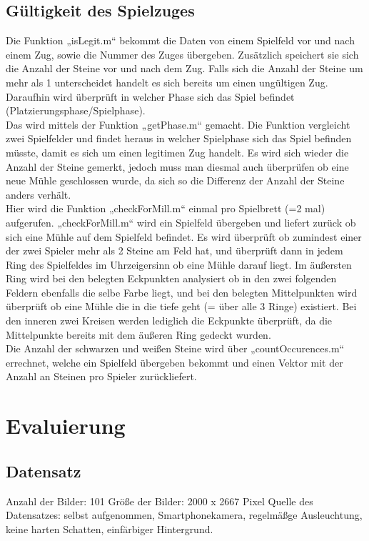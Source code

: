 \documentclass[paper=A4, deutsch]{scrartcl}
\begin{document}
\subsection{Gültigkeit des Spielzuges}
Die Funktion „isLegit.m“ bekommt die Daten von einem Spielfeld vor und nach einem Zug, sowie die Nummer des Zuges übergeben. Zusätzlich speichert sie sich die Anzahl der Steine vor und nach dem Zug.
Falls sich die Anzahl der Steine um mehr als 1 unterscheidet handelt es sich bereits um einen ungültigen Zug. Daraufhin wird überprüft in welcher Phase sich das Spiel befindet (Platzierungsphase/Spielphase).\\
Das wird mittels der Funktion „getPhase.m“ gemacht. Die Funktion vergleicht zwei Spielfelder und findet heraus in welcher Spielphase sich das Spiel befinden müsste, damit es sich um einen legitimen Zug handelt. Es wird sich wieder die Anzahl der Steine gemerkt, jedoch muss man diesmal auch überprüfen ob eine neue Mühle geschlossen wurde, da sich so die Differenz der Anzahl der Steine anders verhält.\\
Hier wird die Funktion „checkForMill.m“ einmal pro Spielbrett (=2 mal) aufgerufen. „checkForMill.m“ wird ein Spielfeld übergeben und liefert zurück ob sich eine Mühle auf dem Spielfeld befindet. Es wird überprüft ob zumindest einer der zwei Spieler mehr als 2 Steine am Feld hat, und überprüft dann in jedem Ring des Spielfeldes im Uhrzeigersinn ob eine Mühle darauf liegt. Im äußersten Ring wird bei den belegten Eckpunkten analysiert ob in den zwei folgenden Feldern ebenfalls die selbe Farbe liegt, und bei den belegten Mittelpunkten wird überprüft ob eine Mühle die in die tiefe geht (= über alle 3 Ringe) existiert. Bei den inneren zwei Kreisen werden lediglich die Eckpunkte überprüft, da die Mittelpunkte bereits mit dem äußeren Ring gedeckt wurden.\\
Die Anzahl der schwarzen und weißen Steine wird über „countOccurences.m“ errechnet, welche ein Spielfeld übergeben bekommt und einen Vektor mit der Anzahl an Steinen pro Spieler zurückliefert.



\section{Evaluierung}

\subsection{Datensatz}
Anzahl der Bilder: 101
Größe der Bilder: 2000 x 2667 Pixel
Quelle des Datensatzes: selbst aufgenommen, Smartphonekamera, regelmäßge Ausleuchtung, keine harten Schatten, einfärbiger Hintergrund.\\
\end{document}
